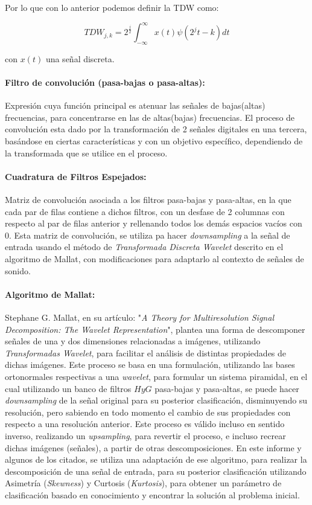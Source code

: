 \documentclass[11pt]{article}
\begin{document}
Por lo que con lo anterior podemos definir la TDW como:

\begin{equation*}
    TDW_{j, k} = 2^{\frac{j}{2}}\int_{-\infty}^{\infty}x(t)\psi(2^{j}t-k)dt
\end{equation*}

con \(x(t)\) una señal discreta. 

\paragraph*{Filtro de convolución (pasa-bajas o pasa-altas):}
Expresión cuya función principal es atenuar las señales de bajas(altas) frecuencias, para concentrarse en las de altas(bajas) frecuencias. El proceso de convolución esta dado por la transformación de 2 señales digitales en una tercera, basándose en ciertas 
características y con un objetivo específico, dependiendo de la transformada que se utilice en el proceso.

\paragraph*{Cuadratura de Filtros Espejados:}
Matriz de convolución asociada a los filtros pasa-bajas y pasa-altas, en la que cada par de filas contiene a dichos filtros, con un desfase de 2 columnas con respecto al par de filas anterior y rellenando todos los demás espacios vacíos con 0. Esta matriz de convolución, 
se utiliza pa hacer {\it downsampling} a la señal de entrada usando el método de {\it Transformada Discreta Wavelet} descrito en el algoritmo de Mallat, con modificaciones para adaptarlo al contexto de señales de sonido.

\paragraph*{Algoritmo de Mallat:}
Stephane G. Mallat, en su artículo: "{\it A Theory for Multiresolution Signal Decomposition: The Wavelet Representation}", plantea una forma de descomponer señales de una y dos dimensiones relacionadas a imágenes, utilizando {\it Transformadas Wavelet}, para facilitar el análisis 
de distintas propiedades de dichas imágenes. Este proceso se basa en una formulación, utilizando las bases ortonormales respectivas a una {\it wavelet}, para formular un sistema piramidal, en el cual utilizando un banco de filtros \(H y G\) pasa-bajas y pasa-altas, se puede 
hacer {\it downsampling} de la señal original para su posterior clasificación, disminuyendo su resolución, pero sabiendo en todo momento el cambio de sus propiedades con respecto a una resolución anterior. Este proceso es válido incluso en sentido inverso, realizando un {\it upsampling}, para 
revertir el proceso, e incluso recrear dichas imágenes (señales), a partir de otras descomposiciones. En este informe y algunos de los citados, se utiliza una adaptación de ese algoritmo, para realizar la descomposición de una señal de entrada, para su posterior clasificación utilizando 
Asimetría ({\it Skewness}) y Curtosis ({\it Kurtosis}), para obtener un parámetro de clasificación basado en conocimiento y encontrar la solución al problema inicial.
\end{document}
